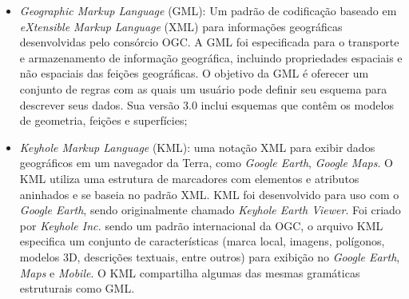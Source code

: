 \begin{itemize}
\item \textit{Geographic Markup Language} (GML): Um padrão de codificação baseado em \textit{eXtensible Markup Language} (XML) para informações geográficas desenvolvidas pelo consórcio OGC. A GML foi especificada para o transporte e armazenamento de informação geográfica, incluindo propriedades espaciais e não espaciais das feições geográficas. O objetivo da GML é oferecer um conjunto de regras com as quais um usuário pode definir seu esquema para descrever seus dados. Sua versão 3.0 inclui esquemas que contêm os modelos de geometria, feições e superfícies;
\item \textit{Keyhole Markup Language} (KML): uma notação XML para exibir dados geográficos em um navegador da Terra, como \textit{Google Earth}, \textit{Google Maps}. O KML utiliza uma estrutura de marcadores com elementos e atributos aninhados e se baseia no padrão XML. KML foi desenvolvido para uso com o \textit{Google Earth}, sendo originalmente chamado \textit{Keyhole Earth Viewer}. Foi criado por \textit{Keyhole Inc.} sendo um padrão internacional da OGC, o arquivo KML especifica um conjunto de características (marca local, imagens, polígonos, modelos 3D, descrições textuais, entre outros) para exibição no \textit{Google Earth}, \textit{Maps} e \textit{Mobile}. O KML compartilha algumas das mesmas gramáticas estruturais como GML.

\newpage


\end{itemize}
